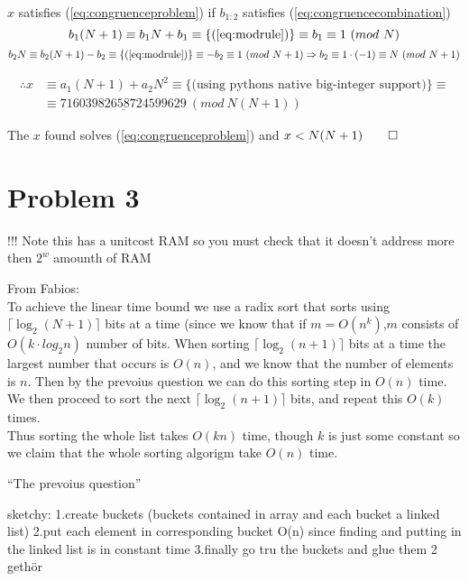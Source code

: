 \documentclass[a4paper,twoside=false,abstract=false,numbers=noenddot,
titlepage=false,headings=small,parskip=half,version=last]{scrartcl}
\begin{document}
$x$ satisfies (\ref{eq:congruenceproblem}) if $b_{1:2}$ satisfies (\ref{eq:congruencecombination})
\begin{equation*}
    b_{1}(N+1) \equiv b_{1}N+b_{1} \equiv \{(\ref{eq:modrule})\} \equiv b_{1} \equiv 1\ (mod\ N) 
\end{equation*}
\begin{equation*}
    b_{2}N \equiv b_{2}(N+1)-b_{2} \equiv \{(\ref{eq:modrule})\} \equiv -b_{2} \equiv 1\ (mod\ N+1)
    \Rightarrow
    b_{2} \equiv 1\cdot (-1) \equiv N\ (mod\ N+1)
\end{equation*}

\begin{equation*}
    \begin{split}
        \therefore x & \equiv a_{1}(N+1)+a_{2}N^{2} \equiv \{\text{(using pythons native big-integer support)}\} \equiv \\
        & \equiv \underline{71603982658724599629}\ (mod\ N(N+1))
    \end{split}
\end{equation*}

The $x$ found solves (\ref{eq:congruenceproblem}) and $x<N(N+1) \qed$


\section{Problem 3}

!!! Note this has a unitcost RAM so you must check that it doesn't address more then $2^w$ amounth of RAM

From Fabios:\\

To achieve the linear time bound we use a radix sort that sorts using $\lceil{\log_2(N+1)}\rceil$ bits at a time 
(since we know that if $m = O(n^k)$,$m$ consists of $O(k\cdot log_2{n})$ number of bits.
When sorting $\lceil\log_2{(n+1)}\rceil$ bits at a time the largest number that occurs is $O(n)$, 
and we know that the number of elements is $n$.
Then by the prevoius question we can do this sorting step in $O(n)$ time. We then proceed to sort the next $\lceil\log_2{(n+1)}\rceil$ bits, and
repeat this $O(k)$ times.\\
Thus sorting the whole list takes $O(kn)$ time, though $k$ is just some constant so we claim that the whole sorting algorigm take $O(n)$ time.

``The prevoius question''

sketchy:
1.create buckets (buckets contained in array and each bucket a linked list)
2.put each element in corresponding bucket O(n) since finding and putting in the linked list is in constant time
3.finally go tru the buckets and glue them 2 gethör
\end{document}
